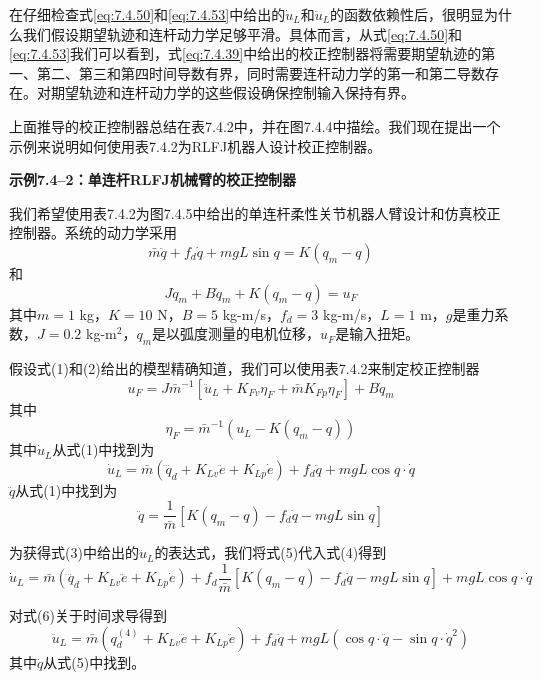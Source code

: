 \documentclass[UTF8]{ctexart}
\begin{document}
在仔细检查式\eqref{eq:7.4.50}和\eqref{eq:7.4.53}中给出的$\dot{u}_L$和$\ddot{u}_L$的函数依赖性后，很明显为什么我们假设期望轨迹和连杆动力学足够平滑。具体而言，从式\eqref{eq:7.4.50}和\eqref{eq:7.4.53}我们可以看到，式\eqref{eq:7.4.39}中给出的校正控制器将需要期望轨迹的第一、第二、第三和第四时间导数有界，同时需要连杆动力学的第一和第二导数存在。对期望轨迹和连杆动力学的这些假设确保控制输入保持有界。

上面推导的校正控制器总结在表7.4.2中，并在图7.4.4中描绘。我们现在提出一个示例来说明如何使用表7.4.2为RLFJ机器人设计校正控制器。

\textbf{示例7.4--2：单连杆RLFJ机械臂的校正控制器}

我们希望使用表7.4.2为图7.4.5中给出的单连杆柔性关节机器人臂设计和仿真校正控制器。系统的动力学采用
\begin{equation}
\bar{m}\ddot{q} + f_d \dot{q} + mgL \sin q = K(q_m - q)
\end{equation}
和
\begin{equation}
J\ddot{q}_m + B\dot{q}_m + K(q_m - q) = u_F
\end{equation}
其中$m=1$ kg，$K=10$ N，$B=5$ kg-m/s，$f_d=3$ kg-m/s，$L=1$ m，$g$是重力系数，$J=0.2$ kg-m$^2$，$q_m$是以弧度测量的电机位移，$u_F$是输入扭矩。

假设式(1)和(2)给出的模型精确知道，我们可以使用表7.4.2来制定校正控制器
\begin{equation}
u_F = J\bar{m}^{-1}[\ddot{u}_L + K_{Fv}\eta_F + \bar{m}K_{Fp}\eta_F] + B\dot{q}_m
\end{equation}
其中
\begin{equation}
\eta_F = \bar{m}^{-1}(u_L - K(q_m - q))
\end{equation}
其中$\dot{u}_L$从式(1)中找到为
\begin{equation}
\dot{u}_L = \bar{m}(\dddot{q}_d + K_{Lv}\ddot{e} + K_{Lp}\dot{e}) + f_d\ddot{q} + mgL\cos q \cdot \dot{q}
\end{equation}
$\ddot{q}$从式(1)中找到为
\begin{equation}
\ddot{q} = \frac{1}{\bar{m}}[K(q_m - q) - f_d \dot{q} - mgL \sin q]
\end{equation}

为获得式(3)中给出的$\ddot{u}_L$的表达式，我们将式(5)代入式(4)得到
\begin{equation}
\dot{u}_L = \bar{m}(\dddot{q}_d + K_{Lv}\ddot{e} + K_{Lp}\dot{e}) + f_d\frac{1}{\bar{m}}[K(q_m - q) - f_d \dot{q} - mgL \sin q] + mgL\cos q \cdot \dot{q}
\end{equation}

对式(6)关于时间求导得到
\begin{equation}
\ddot{u}_L = \bar{m}(q_d^{(4)} + K_{Lv}\dddot{e} + K_{Lp}\ddot{e}) + f_d\ddot{q} + mgL(\cos q \cdot \ddot{q} - \sin q \cdot \dot{q}^2)
\end{equation}
其中$\ddot{q}$从式(5)中找到。
\end{document}
